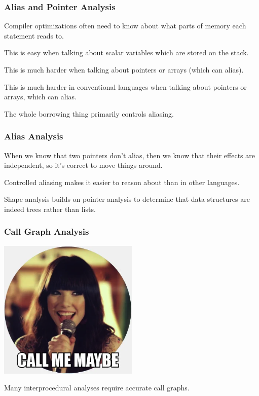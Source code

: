 \begin{frame}
\frametitle{Alias and Pointer Analysis}

Compiler optimizations often need
to know about what parts of memory each statement reads to.  

This is
easy when talking about scalar variables which are stored on the
stack. 

This is much harder when talking about pointers or arrays
(which can alias). 

This is much harder in conventional languages when talking about pointers or arrays, which can alias. 

The whole borrowing thing primarily controls aliasing.

\end{frame}

\begin{frame}
\frametitle{Alias Analysis}

When we know that two pointers don't alias, then we know that their
effects are independent, so it's correct to move things around.

Controlled aliasing makes it easier to reason about than in other languages.

Shape analysis
builds on pointer analysis to determine that data structures are indeed
trees rather than lists.


\end{frame}


\begin{frame}
\frametitle{Call Graph Analysis}

\begin{center}
	\includegraphics[width=0.5\textwidth]{images/CallMeMaybe.png}
\end{center}

Many interprocedural analyses require accurate call graphs. 

\end{frame}


